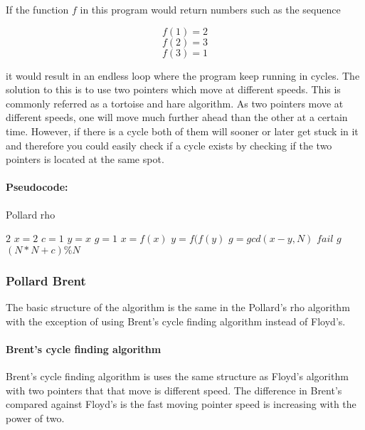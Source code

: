 If the function \(f\) in this program would return numbers such as the sequence

\[f(1) = 2\] 
\[f(2) = 3\] 
\[f(3) = 1\]

it would result in an endless loop where the program keep running in cycles. The solution to this is to use two pointers which move at different speeds. This is commonly referred as a tortoise and hare algorithm. 
As two pointers move at different speeds, one will move much further ahead than the other at a certain time. However, if there is a cycle both of them will sooner or later get stuck in it and therefore you could easily check if a cycle exists by checking if the two pointers is located at the same spot.

\paragraph{Pseudocode:}

\textcolor{white}{ }

\begin{algorithm}[H]
\caption{Pollard rho}
\begin{algorithmic}
	 	\State \Return $2$
	\EndIf
	\State $x = 2$
	\State $c = 1$
	\State $y = x$
	\State $g = 1$
		\State $x = f(x)$
		\State $y = f(f(y)$
		\State $g = gcd(x-y,N)$
	\EndWhile
		\State \Return $fail$
	\EndIf
	\State \Return $g$	
\EndFunction
{}
	\State \Return $(N*N + c) \% N$
\EndFunction
\end{algorithmic}
\end{algorithm}

\subsubsection{Pollard Brent}

The basic structure of the algorithm is the same in the Pollard's rho algorithm with the exception of using Brent's cycle finding algorithm instead of Floyd's.

\paragraph{Brent's cycle finding algorithm\\}

Brent’s cycle finding algorithm is uses the same structure as Floyd’s algorithm with two pointers that that move is different speed. The difference in Brent’s compared against Floyd’s is the fast moving pointer speed is increasing with the power of two.

